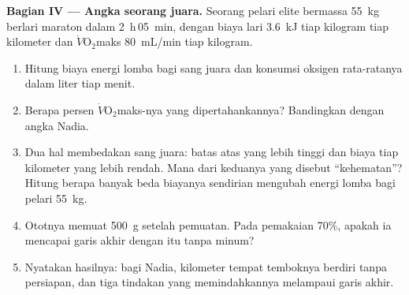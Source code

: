 \begin{problem}
\medskip
\noindent\textbf{Bagian IV --- Angka seorang juara.}
Seorang pelari elite bermassa \qty{55}{kg} berlari maraton dalam
\qty{2}{h}\,\qty{05}{min}, dengan biaya lari \qty{3.6}{kJ} tiap
kilogram tiap kilometer dan $\dot V\!\mathrm{O_2}$maks \qty{80}{mL/min}
tiap kilogram.
\begin{enumerate}[resume]
  \item Hitung biaya energi lomba bagi sang juara dan konsumsi oksigen
        rata-ratanya dalam liter tiap menit.
  \item Berapa persen $\dot V\!\mathrm{O_2}$maks-nya yang
        dipertahankannya? Bandingkan dengan angka Nadia.
  \item Dua hal membedakan sang juara: batas atas yang lebih tinggi dan
        biaya tiap kilometer yang lebih rendah. Mana dari keduanya yang
        disebut ``kehematan''? Hitung berapa banyak beda biayanya
        sendirian mengubah energi lomba bagi pelari \qty{55}{kg}.
  \item Ototnya memuat \qty{500}{g}  setelah pemuatan. Pada
        pemakaian  70\%, apakah ia mencapai garis akhir
        dengan  itu tanpa minum?
  \item Nyatakan hasilnya: bagi Nadia, kilometer tempat temboknya
        berdiri tanpa persiapan, dan tiga tindakan yang memindahkannya
        melampaui garis akhir.
\end{enumerate}
\end{problem}
